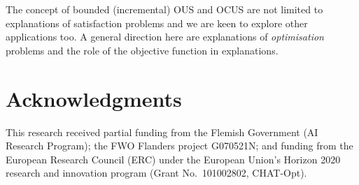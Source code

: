 The concept of bounded (incremental) OUS and OCUS are not limited to explanations of satisfaction problems and we are keen to explore other applications too.
A general direction here are explanations of \textit{optimisation} problems and the role of the objective function in explanations.
%

\nopagebreak[0]
\section*{Acknowledgments}
This research received partial funding
from the Flemish Government (AI Research Program); the FWO Flanders project G070521N; and funding from the European Research Council (ERC) under the European Union’s Horizon 2020 research and innovation program (Grant No.~101002802, CHAT-Opt).
